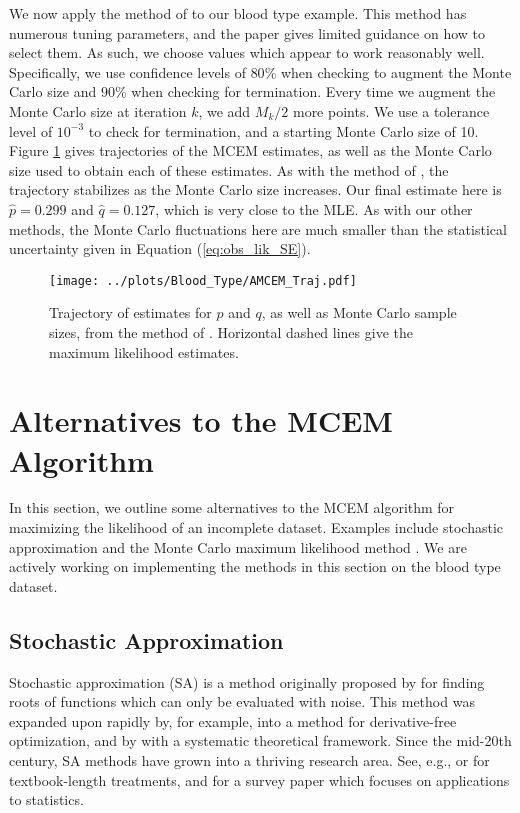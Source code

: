 \documentclass[11pt, oneside]{article}   	%
\begin{document}
We now apply the method of \citeauthor{Caf05} to our blood type example. This method has numerous tuning parameters, and the paper gives limited guidance on how to select them. As such, we choose values which appear to work reasonably well. Specifically, we use confidence levels of $80\%$ when checking to augment the Monte Carlo size and $90\%$ when checking for termination. Every time we augment the Monte Carlo size at iteration $k$, we add $M_k/2$ more points. We use a tolerance level of $10^{-3}$ to check for termination, and a starting Monte Carlo size of 10. Figure \ref{fig2:blood_AMCEM_traj} gives trajectories of the MCEM estimates, as well as the Monte Carlo size used to obtain each of these estimates. As with the method of \citet{Boo99}, the trajectory stabilizes as the Monte Carlo size increases. Our final estimate here is $\hat{p} = 0.299$ and $\hat{q} = 0.127$, which is very close to the MLE. As with our other methods, the Monte Carlo fluctuations here are much smaller than the statistical uncertainty given in Equation (\ref{eq:obs_lik_SE}).

\begin{figure}
    \centering
    \caption{Trajectory of estimates for $p$ and $q$, as well as Monte Carlo sample sizes, from the method of \citeauthor{Caf05}. Horizontal dashed lines give the maximum likelihood estimates.}
    \label{fig2:blood_AMCEM_traj}
    \texttt{[image: ../plots/Blood\_Type/AMCEM\_Traj.pdf]}   
\end{figure}

\section{Alternatives to the MCEM Algorithm}
\label{sec2:alternatives}

In this section, we outline some alternatives to the MCEM algorithm for maximizing the likelihood of an incomplete dataset. Examples include stochastic approximation \citep{Rob51, Lai03} and the Monte Carlo maximum likelihood method \citep{Gel93, Gey94}. We are actively working on implementing the methods in this section on the blood type dataset.


\subsection{Stochastic Approximation}
\label{sec2:SAEM}

Stochastic approximation (SA) is a method originally proposed by \citet{Rob51} for finding roots of functions which can only be evaluated with noise. This method was expanded upon rapidly by, for example, \citet{Kie52} into a method for derivative-free optimization, and by \citet{Dvo56} with a systematic theoretical framework. Since the mid-20th century, SA methods have grown into a thriving research area. See, e.g., \citet{Kus97} or \citet{Bor22} for textbook-length treatments, and \citet{Lai03} for a survey paper which focuses on applications to statistics.
\end{document}
